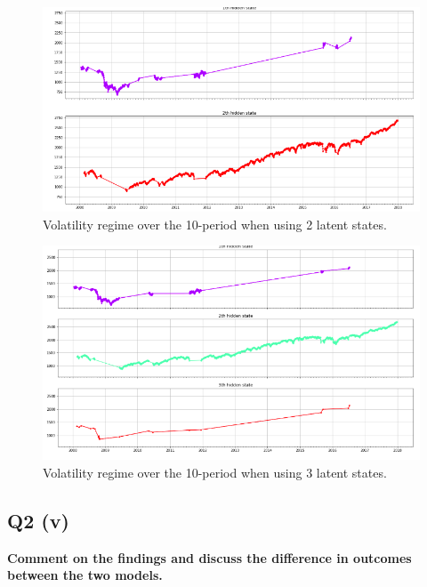 \begin{figure}[H]
\centering
  \includegraphics[scale = .60]{imgs/regime1.png}
  \caption{Volatility regime over the 10-period when using 2 latent states.}
  \label{fig:regime1}
\end{figure}

\begin{figure}[H]
\centering
  \includegraphics[scale = .65]{imgs/regime2.png}
  \caption{Volatility regime over the 10-period when using 3 latent states.}
  \label{fig:regime2}
\end{figure}



\subsection{Q2 (v)}\label{sssec:pt2q3v}
\textbf{Comment on the findings and discuss the difference in outcomes between the two models.}

